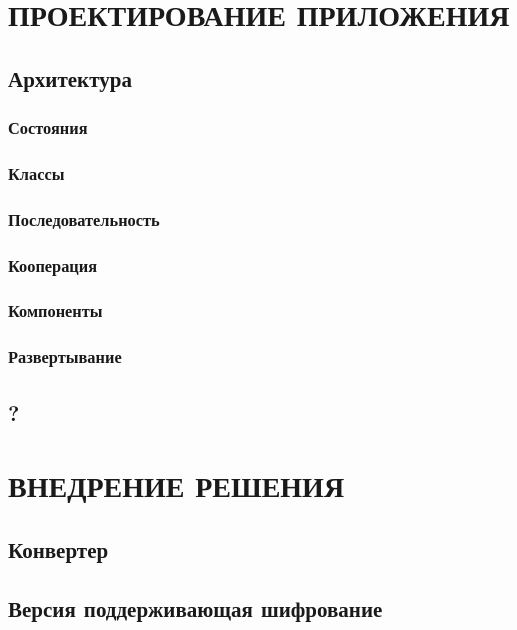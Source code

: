 \newpage
\chapter{ПРОЕКТИРОВАНИЕ ПРИЛОЖЕНИЯ}
\section{Архитектура}
\subsection{Состояния}

\subsection{Классы}

\subsection{Последовательность}

\subsection{Кооперация}

\subsection{Компоненты}

\subsection{Развертывание}

\section{?}

\newpage
\chapter{ВНЕДРЕНИЕ РЕШЕНИЯ}
\section{Конвертер}

\section{Версия поддерживающая шифрование}

